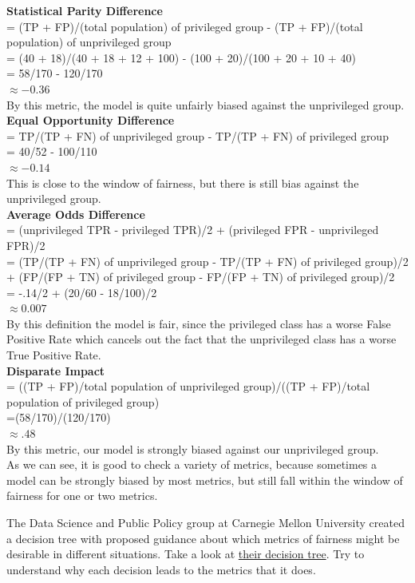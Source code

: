 \documentclass[assignment03_Solutions]{subfiles}
\begin{document}
\begin{exercise}[(40 Minutes)]
\begin{boxedsolution}
\textbf{Statistical Parity Difference}\\
= (TP + FP)/(total population) of privileged group - (TP + FP)/(total population) of unprivileged group\\
=  (40 + 18)/(40 + 18 + 12 + 100) - (100 + 20)/(100 + 20 + 10 + 40)\\
= 58/170 - 120/170\\
$\approx -0.36$\\
By this metric, the model is quite unfairly biased against the unprivileged group.\\
\textbf{Equal Opportunity Difference}\\
= TP/(TP + FN) of unprivileged group - TP/(TP + FN) of privileged group\\
= 40/52 - 100/110\\
$\approx -0.14$\\
This is close to the window of fairness, but there is still bias against the unprivileged group.\\
\textbf{Average Odds Difference}\\
= (unprivileged TPR - privileged TPR)/2 + (privileged FPR - unprivileged FPR)/2\\
= (TP/(TP + FN) of unprivileged group - TP/(TP + FN) of privileged group)/2 + (FP/(FP + TN) of privileged group - FP/(FP + TN) of privileged group)/2\\
= -.14/2 + (20/60 - 18/100)/2\\
$\approx 0.007$\\
By this definition the model is fair, since the privileged class has a worse False Positive Rate which cancels out the fact that the unprivileged class has a worse True Positive Rate.\\
\textbf{Disparate Impact}\\
= ((TP + FP)/total population of unprivileged group)/((TP + FP)/total population of privileged group)\\
=(58/170)/(120/170)\\
$\approx .48$\\
By this metric, our model is strongly biased against our unprivileged group.\\
As we can see, it is good to check a variety of metrics, because sometimes a model can be strongly biased by most metrics, but still fall within the window of fairness for one or two metrics.
\end{boxedsolution}

\item The Data Science and Public Policy group at Carnegie Mellon University created a decision tree with proposed guidance about which metrics of fairness might be desirable in different situations. Take a look at  \href{http://www.datasciencepublicpolicy.org/wp-content/uploads/2018/05/metrictree-1024x640.png}{their decision tree}. Try to understand why each decision leads to the metrics that it does. 


\end{exercise}
\end{document}
